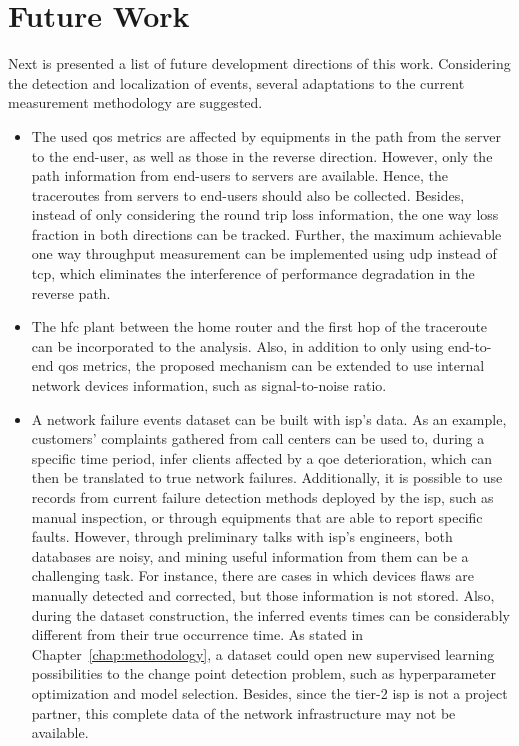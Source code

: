 \section{Future Work}
\label{sec:future_work}

Next is presented a list of future development directions of this work.
Considering the detection and localization of events, several adaptations to
the current measurement methodology are suggested.

\begin{itemize}
\item
The used \gls*{qos} metrics are affected by equipments in the path from the server to
the end-user, as well as those in the reverse direction.
However, only the path information from end-users to servers are available.
Hence, the traceroutes from servers to end-users should also be collected.
Besides, instead of only considering the round trip loss information,
the one way loss fraction in both directions can be tracked.
Further, the maximum achievable one way throughput measurement can be
implemented using \gls*{udp} instead of \gls*{tcp}, which eliminates the interference of
performance degradation in the reverse path.

\item
The \gls*{hfc} plant between the home router and the
first hop of the traceroute can be incorporated to the analysis.
Also, in addition to only using end-to-end \gls*{qos} metrics,
the proposed mechanism can be extended
to use internal network devices information, such as signal-to-noise ratio.

\item
A network failure events dataset can be built with \gls*{isp}'s data.
As an example, customers' complaints gathered from call centers can be used to,
during a specific time period, infer clients affected by a \gls*{qoe} deterioration,
which can then be translated to true network failures.
Additionally, it is possible to use records from current failure detection
methods deployed by the \gls*{isp}, such as manual inspection, or through equipments
that are able to report specific faults.
However, through preliminary talks with \gls*{isp}'s engineers,
both databases are noisy, and mining useful information
from them can be a challenging task.
For instance, there are cases in which devices flaws are manually
detected and corrected, but those information is not stored.
Also, during the dataset construction, the inferred events times can be
considerably different from their true occurrence time.
As stated in Chapter~\ref{chap:methodology}, a dataset could open new
supervised learning possibilities to the change point detection problem, such
as hyperparameter optimization and model selection.
Besides, since the tier-2 \gls*{isp} is not a project partner, this
complete data of the network infrastructure may not be available.


\end{itemize}
